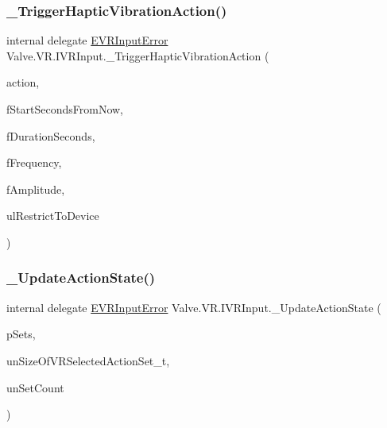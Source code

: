 \mbox{\label{struct_valve_1_1_v_r_1_1_i_v_r_input_acccca4f15062478fdac76cc1e1a95ec5}} 
\subsubsection{\texorpdfstring{\_TriggerHapticVibrationAction()}{\_TriggerHapticVibrationAction()}}
{\footnotesize\ttfamily internal delegate \mbox{\hyperlink{namespace_valve_1_1_v_r_a592d7f4189b8346d6c96dbdbaa35bc1b}{E\+V\+R\+Input\+Error}} Valve.\+V\+R.\+I\+V\+R\+Input.\+\_\+\+Trigger\+Haptic\+Vibration\+Action (\begin{DoxyParamCaption}\item[{ulong}]{action,  }\item[{float}]{f\+Start\+Seconds\+From\+Now,  }\item[{float}]{f\+Duration\+Seconds,  }\item[{float}]{f\+Frequency,  }\item[{float}]{f\+Amplitude,  }\item[{ulong}]{ul\+Restrict\+To\+Device }\end{DoxyParamCaption})}

\mbox{\label{struct_valve_1_1_v_r_1_1_i_v_r_input_a71824d045beb4928cad94006a0e435a6}} 
\subsubsection{\texorpdfstring{\_UpdateActionState()}{\_UpdateActionState()}}
{\footnotesize\ttfamily internal delegate \mbox{\hyperlink{namespace_valve_1_1_v_r_a592d7f4189b8346d6c96dbdbaa35bc1b}{E\+V\+R\+Input\+Error}} Valve.\+V\+R.\+I\+V\+R\+Input.\+\_\+\+Update\+Action\+State (\begin{DoxyParamCaption}\item[{\mbox{[}\+In, Out\mbox{]} \mbox{\hyperlink{struct_valve_1_1_v_r_1_1_v_r_active_action_set__t}{V\+R\+Active\+Action\+Set\+\_\+t}} \mbox{[}$\,$\mbox{]}}]{p\+Sets,  }\item[{uint}]{un\+Size\+Of\+V\+R\+Selected\+Action\+Set\+\_\+t,  }\item[{uint}]{un\+Set\+Count }\end{DoxyParamCaption})}



